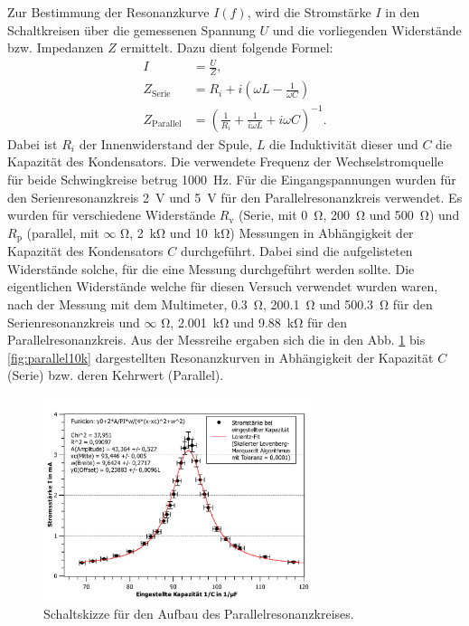 	Zur Bestimmung der Resonanzkurve $I(f)$, wird die Stromstärke $I$ in den Schaltkreisen über die gemessenen Spannung $U$ und die vorliegenden Widerstände bzw. Impedanzen $Z$ ermittelt.
	Dazu dient folgende Formel:
	\begin{align}
		I &= \frac{U}{Z}, \\
		Z_\text{Serie} &= R_i + i\left(\omega L - \frac{1}{\omega C} \right) \\
		Z_\text{Parallel} &= \left( \frac{1}{R_i} + \frac{1}{i\omega L} + i\omega C\right)^{-1} . 
	\end{align}
	Dabei ist $R_i$ der Innenwiderstand der Spule, $L$ die Induktivität dieser und $C$ die Kapazität des Kondensators.	
	Die verwendete Frequenz der Wechselstromquelle für beide Schwingkreise betrug \SI{1000}{\hertz}.
	Für die Eingangspannungen wurden für den Serienresonanzkreis \SI{2}{\volt} und \SI{5}{\volt} für den Parallelresonanzkreis verwendet.
	Es wurden für verschiedene Widerstände $R_\text{v}$ (Serie, mit \SI{0}{\ohm}, \SI{200}{\ohm} und \SI{500}{\ohm}) und $R_\text{p}$ (parallel, mit $\infty$ \si{\ohm}, \SI{2}{\kilo\ohm} und \SI{10}{\kilo\ohm}) Messungen in Abhängigkeit der Kapazität des Kondensators $C$ durchgeführt. 
	Dabei sind die aufgelisteten Widerstände solche, für die eine Messung durchgeführt werden sollte.
	Die eigentlichen Widerstände welche für diesen Versuch verwendet wurden waren, nach der Messung mit dem Multimeter, \SI{0,3}{\ohm}, \SI{200,1}{\ohm} und \SI{500,3}{\ohm} für den Serienresonanzkreis und $\infty$ \si{\ohm}, \SI{2,001}{\kilo\ohm} und \SI{9,88}{\kilo\ohm} für den Parallelresonanzkreis.
	Aus der Messreihe ergaben sich die in den Abb. \ref{fig:reihe0} bis \ref{fig:parallel10k} dargestellten Resonanzkurven in Abhängigkeit der Kapazität $C$ (Serie) bzw. deren Kehrwert (Parallel). 
	\begin{figure}[ht]
		\centering
		\includegraphics[width=0.7\textwidth]{auswertung/Reihe-0ohm(algo).pdf}
		\caption{Schaltskizze für den Aufbau des Parallelresonanzkreises.}
		\label{fig:reihe0}	
	\end{figure}
